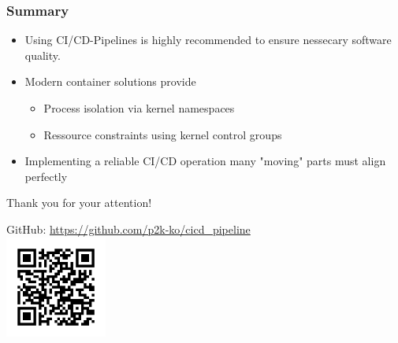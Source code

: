 \begin{frame}
\frametitle{Summary}
\begin{itemize}
\item Using CI/CD-Pipelines is highly recommended to ensure nessecary software quality.
\pause
\item Modern container solutions provide
\begin{itemize}
	\pause
	\item Process isolation via kernel namespaces
	\pause
	\item Ressource constraints using kernel control groups
\end{itemize}
\pause
\item Implementing a reliable CI/CD operation many "moving" parts must align perfectly 
\pause
\end{itemize}
\end{frame}

\begin{frame}
	\begin{center}
		\begin{Huge}
			Thank you for your attention!
		\end{Huge}
		
		\vspace{1cm}
		
		GitHub: \url{https://github.com/p2k-ko/cicd_pipeline}\\
		\includegraphics[width=0.25\textwidth]{img/github.png}
	\end{center}
\end{frame}
